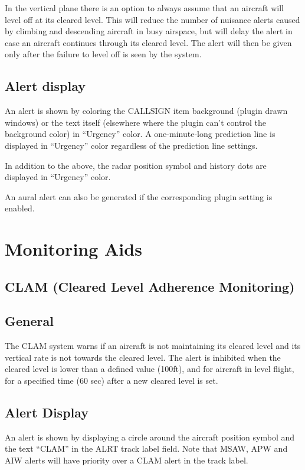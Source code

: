 \documentclass[11pt,a4paper,oldfontcommands]{memoir}
\begin{document}
In the vertical plane there is an option to always assume that an aircraft will level off at its cleared level. This will reduce the number of nuisance alerts caused by climbing and descending aircraft in busy airspace, but will delay the alert in case an aircraft continues through its cleared level. The alert will then be given only after the failure to level off is seen by the system.

\subsection*{Alert display}

An alert is shown by coloring the CALLSIGN item background (plugin drawn windows) or the text itself (elsewhere where the plugin can’t control the background color) in “Urgency” color. A one-minute-long prediction line is displayed in “Urgency” color regardless of the prediction line settings. 

In addition to the above, the radar position symbol and history dots are displayed in “Urgency” color.

An aural alert can also be generated if the corresponding plugin setting is enabled.

\section{Monitoring Aids}

\subsection{CLAM (Cleared Level Adherence Monitoring)}

\subsection*{General}

The CLAM system warns if an aircraft is not maintaining its cleared level and its vertical rate is not towards the cleared level. The alert is inhibited when the cleared level is lower than a defined value (100ft), and for aircraft in level flight, for a specified time (60 sec) after a new cleared level is set.

\subsection*{Alert Display}

An alert is shown by displaying a circle around the aircraft position symbol and the text “CLAM” in the ALRT track label field. Note that MSAW, APW and AIW alerts will have priority over a CLAM alert in the track label.
\end{document}
